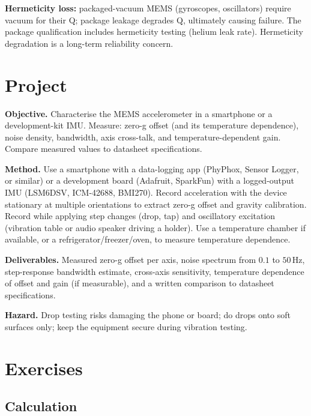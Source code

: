 \textbf{Hermeticity loss:} packaged-vacuum MEMS (gyroscopes, oscillators) require vacuum for their Q; package leakage degrades Q, ultimately causing failure. The package qualification includes hermeticity testing (helium leak rate). Hermeticity degradation is a long-term reliability concern.

\section{Project}

\begin{project}
\textbf{Objective.} Characterise the MEMS accelerometer in a smartphone or a development-kit IMU. Measure: zero-g offset (and its temperature dependence), noise density, bandwidth, axis cross-talk, and temperature-dependent gain. Compare measured values to datasheet specifications.

\textbf{Method.} Use a smartphone with a data-logging app (PhyPhox, Sensor Logger, or similar) or a development board (Adafruit, SparkFun) with a logged-output IMU (LSM6DSV, ICM-42688, BMI270). Record acceleration with the device stationary at multiple orientations to extract zero-g offset and gravity calibration. Record while applying step changes (drop, tap) and oscillatory excitation (vibration table or audio speaker driving a holder). Use a temperature chamber if available, or a refrigerator/freezer/oven, to measure temperature dependence.

\textbf{Deliverables.} Measured zero-g offset per axis, noise spectrum from $0.1$ to $50\,\text{Hz}$, step-response bandwidth estimate, cross-axis sensitivity, temperature dependence of offset and gain (if measurable), and a written comparison to datasheet specifications.

\textbf{Hazard.} Drop testing risks damaging the phone or board; do drops onto soft surfaces only; keep the equipment secure during vibration testing.
\end{project}

\section{Exercises}

\subsection*{Calculation}

